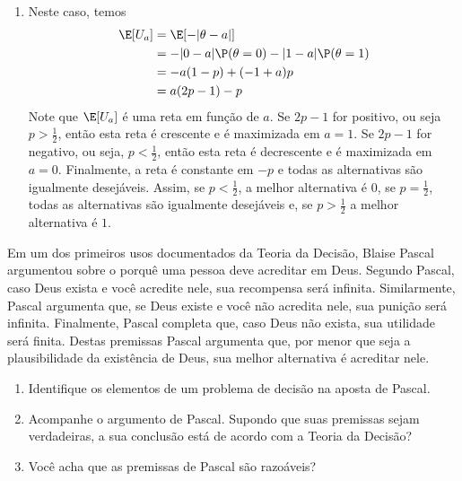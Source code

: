 {\begin{enumerate}[label=(\alph*)]
  Alternativamente, observe que
  \begin{align*}
   \E[U_{a}] &= \E[-(\theta-a)^{2}] \\
   &= -\V[\theta-a] -(\E[\theta]-a)^{2}	\\
   &= -\V[\theta] -(\E[\theta]-a)^{2}
  \end{align*}
  Como $\V[\theta]$ é uma constante (em $a$),
  a decisão que maximiza a utilidade esperada é
  aquela que maximiza $-(\E[\theta]-a)^{2}$, ou seja
  $\E[\theta]=p$.
  \item Neste caso, temos
  \begin{align*}
   \E[U_{a}] &= \E[-|\theta-a|] \\
   &= -|0-a|\P(\theta=0) -|1-a|\P(\theta=1) \\
   &= -a(1-p) + (-1+a)p \\
   &= a(2p-1)-p 
  \end{align*}
  Note que $\E[U_{a}]$ é uma reta em função de $a$.
  Se $2p-1$ for positivo, ou seja $p > \frac{1}{2}$,
  então esta reta é crescente e é maximizada em $a=1$.
  Se $2p-1$ for negativo, ou seja, $p < \frac{1}{2}$,
  então esta reta é decrescente e é maximizada em $a=0$.
  Finalmente, a reta é constante em $-p$ e
  todas as alternativas são igualmente desejáveis.
  Assim, se $p < \frac{1}{2}$, a melhor alternativa é $0$,
  se $p = \frac{1}{2}$, todas as alternativas são
  igualmente desejáveis e,
  se $p > \frac{1}{2}$ a melhor alternativa é $1$.
 \end{enumerate}
}{}

\begin{exercise}
 Em um dos primeiros usos documentados da
 Teoria da Decisão, Blaise Pascal argumentou sobre o
 porquê uma pessoa deve acreditar em Deus.
 Segundo Pascal, caso Deus exista e você acredite nele,
 sua recompensa será infinita.
 Similarmente, Pascal argumenta que, 
 se Deus existe e você não acredita nele,
 sua punição será infinita.
 Finalmente, Pascal completa que,
 caso Deus não exista,
 sua utilidade será finita.
 Destas premissas Pascal argumenta que,
 por menor que seja a plausibilidade da existência de Deus,
 sua melhor alternativa é acreditar nele.
 \begin{enumerate}[label=(\alph*)]
  \item Identifique os elementos de um
  problema de decisão na aposta de Pascal.
  \item Acompanhe o argumento de Pascal.
  Supondo que suas premissas sejam verdadeiras,
  a sua conclusão está de acordo com a
  Teoria da Decisão?
  \item Você acha que as premissas de Pascal
  são razoáveis?
 \end{enumerate}
\end{exercise}


